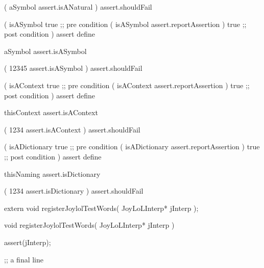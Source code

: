 \startJoylolTest
(
  aSymbol
  assert.isANatural
) assert.shouldFail
\stopJoylolTest
\stopTestCase
\stopTestSuite


\startJoylolCode
(
  isASymbol
  { true } ;; pre condition
  (
    isASymbol
    assert.reportAssertion
  )
  { true } ;; post condition
)
assert
define
\stopJoylolCode

\startJoylolTest
aSymbol
assert.isASymbol
\stopJoylolTest
\stopTestCase

\startJoylolTest
(
  12345
  assert.isASymbol
) assert.shouldFail
\stopJoylolTest
\stopTestCase
\stopTestSuite


\startJoylolCode
(
  isAContext
  { true } ;; pre condition
  (
    isAContext
    assert.reportAssertion
  )
  { true } ;; post condition
)
assert
define
\stopJoylolCode

\startJoylolTest
thisContext
assert.isAContext
\stopJoylolTest
\stopTestCase

\startJoylolTest
(
  1234
  assert.isAContext
) assert.shouldFail
\stopJoylolTest
\stopTestCase
\stopTestSuite


\startJoylolCode
(
  isADictionary
  { true } ;; pre condition
  (
    isADictionary
    assert.reportAssertion
  )
  { true } ;; post condition
)
assert
define
\stopJoylolCode

\startJoylolTest
thisNaming
assert.isDictionary
\stopJoylolTest
\stopTestCase

\startJoylolTest
(
  1234
  assert.isDictionary
) assert.shouldFail
\stopJoylolTest
\stopTestCase
\stopTestSuite

\starttyping
{}

\startJoylolCode
\stopJoylolCode

\startJoylolTest
\stopJoylolTest
\stopTestCase

\startJoylolTest
\stopJoylolTest
\stopTestCase
\stopTestSuite
\stoptyping

\startCHeader
extern void registerJoylolTestWords(
  JoyLoLInterp* jInterp
);
\stopCHeader
{}

\startCCode
void registerJoylolTestWords(
  JoyLoLInterp* jInterp
) {
  assert(jInterp);

}
\stopCCode

\startJoylolCode
;; a final line
\stopJoylolCode
